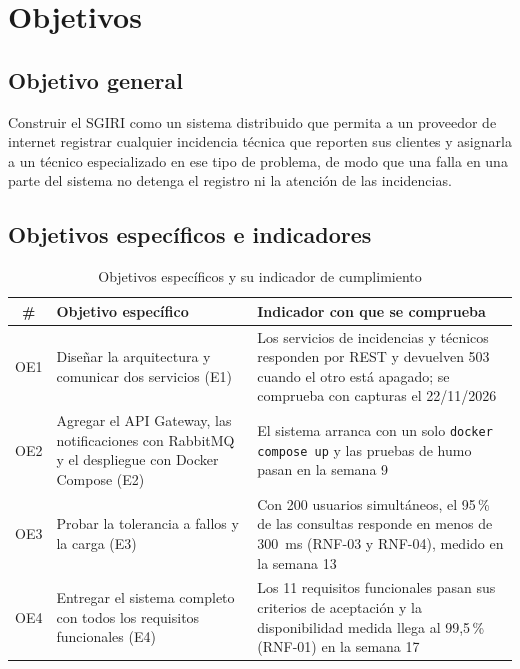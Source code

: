 \section{Objetivos}

\subsection{Objetivo general}

Construir el SGIRI como un sistema distribuido que permita a un proveedor de internet registrar
cualquier incidencia técnica que reporten sus clientes y asignarla a un técnico especializado en
ese tipo de problema, de modo que una falla en una parte del sistema no detenga el registro ni la
atención de las incidencias.

\subsection{Objetivos específicos e indicadores}

\begin{table}[H]
\centering
\caption{Objetivos específicos y su indicador de cumplimiento}
\label{tab:objetivos}
\small
\begin{tabularx}{\linewidth}{@{}clY@{}}
\toprule
\# & Objetivo específico & Indicador con que se comprueba \\
\midrule
OE1 & Diseñar la arquitectura y comunicar dos servicios (E1)
& Los servicios de incidencias y técnicos responden por REST y devuelven 503 cuando el otro está
apagado; se comprueba con capturas el 22/11/2026 \\
OE2 & Agregar el API Gateway, las notificaciones con RabbitMQ y el despliegue con Docker Compose (E2)
& El sistema arranca con un solo \texttt{docker compose up} y las pruebas de humo pasan en la
semana 9 \\
OE3 & Probar la tolerancia a fallos y la carga (E3)
& Con 200 usuarios simultáneos, el 95\,\% de las consultas responde en menos de 300~ms (RNF-03 y
RNF-04), medido en la semana 13 \\
OE4 & Entregar el sistema completo con todos los requisitos funcionales (E4)
& Los 11 requisitos funcionales pasan sus criterios de aceptación y la disponibilidad medida
llega al 99,5\,\% (RNF-01) en la semana 17 \\
\bottomrule
\end{tabularx}
\end{table}
